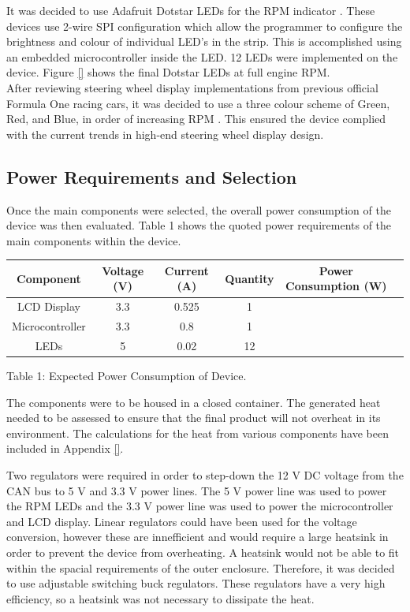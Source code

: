 \documentclass[a4paper,12pt]{article}
\begin{document}
It was decided to use Adafruit Dotstar LEDs for the RPM indicator \cite{dotstar_datasheet}. These devices use 2-wire SPI configuration which allow the programmer to configure the brightness and colour of individual LED’s in the strip. This is accomplished using an embedded microcontroller inside the LED. 12 LEDs were implemented on the device. Figure \ref{} shows the final Dotstar LEDs at full engine RPM. \\

After reviewing steering wheel display implementations from previous official Formula One racing cars, it was decided to use a three colour scheme of Green, Red, and Blue, in order of increasing RPM \cite{bsim_racing, daily_mail_1}. This ensured the device complied with the current trends in high-end steering wheel display design.

\subsection{Power Requirements and Selection}
\label{sec:PSU}

Once the main components were selected, the overall power consumption of the device was then evaluated. Table 1 shows the quoted power requirements of the main components within the device.

\begin{center}
\begin{tabular}{ | c | c | c | c | c | c | }
\hline
 Component & Voltage (V) & Current (A) & Quantity & Power Consumption (W) \\
\hline
 LCD Display & 3.3 & 0.525 & 1 & \\
\hline
 Microcontroller & 3.3 & 0.8 & 1 & \\
\hline
 LEDs & 5 & 0.02 & 12 & \\
\hline
\end{tabular}
\par
\bigskip
Table 1: Expected Power Consumption of Device.
\end{center}

The components were to be housed in a closed container. The generated heat needed to be assessed to ensure that the final product will not overheat in its environment. The calculations for the heat from various components have been included in Appendix \ref{}.
 
Two regulators were required in order to step-down the 12 V DC voltage from the CAN bus to 5 V and 3.3 V power lines. The 5 V power line was used to power the RPM LEDs and the 3.3 V power line was used to power the microcontroller and LCD display. Linear regulators could have been used for the voltage conversion, however these are innefficient and would require a large heatsink in order to prevent the device from overheating. A heatsink would not be able to fit within the spacial requirements of the outer enclosure. Therefore, it was decided to use adjustable switching buck regulators. These regulators have a very high efficiency, so a heatsink was not necessary to dissipate the heat. \\
 
\end{document}
